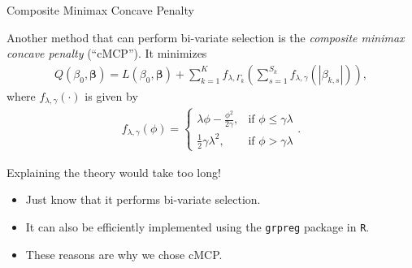 \documentclass[8pt]{beamer}
\newcommand{\mys}{\vspace{0.5cm} %
}
\begin{document}
\begin{frame}{Composite Minimax Concave Penalty}

Another method that can perform bi-variate selection is the \textit{composite minimax concave penalty} (``cMCP''). It minimizes
\begin{align}
    \label{cMCP}
    Q(\beta_0, \bm{\beta}) = L(\beta_0, \bm{\beta}) + \sum_{k=1}^K f_{\lambda, \Gamma_k} \left( \sum_{s=1}^{S_k} f_{\lambda, \gamma}(|\beta_{k,s}|) \right),
\end{align}
where $f_{\lambda, \gamma}(\cdot)$ is given by
\begin{align}
    \label{MCPpenalty}
    f_{\lambda, \gamma}(\phi) = \begin{cases}
        \lambda \phi - \frac{\phi^2}{2 \gamma}, & \text{if } \phi \le \gamma \lambda \\
        \frac{1}{2} \gamma \lambda^2, & \text{if } \phi > \gamma \lambda
    \end{cases}.
\end{align} \mys

Explaining the theory would take too long! \Sadey[1.5][yellow]
\begin{itemize}
    \item Just know that it performs bi-variate selection.
    \item It can also be efficiently implemented using the \texttt{grpreg} package in \texttt{R}.
    \item These reasons are why we chose cMCP.
\end{itemize}
    
\end{frame}
\end{document}
